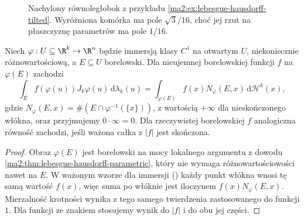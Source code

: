 \begin{figure}[htbp]
\centering
{}
\caption{Nachylony równoległobok z przykładu
\ref{ma2:ex:lebesgue-hausdorff-tilted}.
Wyróżniona komórka ma pole $\sqrt3/16$,
choć jej rzut na płaszczyznę parametrów
ma pole $1/16$.}
\label{ma2:fig:lebesgue-hausdorff-tilted}
\end{figure}

\begin{wniosek}
\label{ma2:cor:lebesgue-hausdorff-multiplicity}
Niech $\varphi:U\subseteq\R^k\to\R^n$
będzie immersją klasy $C^1$ na otwartym
$U$, niekoniecznie różnowartościową,
a $E\subseteq U$ borelowski.
Dla nieujemnej borelowskiej funkcji $f$
na $\varphi(E)$ zachodzi
\[
 \int_E f(\varphi(u))J_k\varphi(u)\,
       \mathrm d\lambda_k(u)
 =\int_{\varphi(E)}f(x)N_\varphi(E,x)\,
       \mathrm d\mathcal H^k(x),
\]
gdzie $N_\varphi(E,x)=\#(E\cap\varphi^{-1}(\{x\}))$,
z wartością $+\infty$ dla nieskończonego
włókna, oraz przyjmujemy $0\cdot\infty=0$.
Dla rzeczywistej borelowskiej $f$
analogiczna równość zachodzi, jeśli
ważona całka z $|f|$ jest skończona.
\end{wniosek}
\begin{proof}
Obraz $\varphi(E)$ jest borelowski na mocy
lokalnego argumentu z dowodu
\ref{ma2:thm:lebesgue-hausdorff-parametric},
który nie wymaga różnowartościowości nawet na $E$.
W ważonym wzorze dla immersji
()
każdy punkt włókna wnosi tę samą
wartość $f(x)$, więc suma po włóknie
jest iloczynem $f(x)N_\varphi(E,x)$.
Mierzalność krotności wynika z tego samego
twierdzenia zastosowanego do funkcji $1$.
Dla funkcji ze znakiem stosujemy wynik
do $|f|$ i do obu jej części.
\end{proof}

